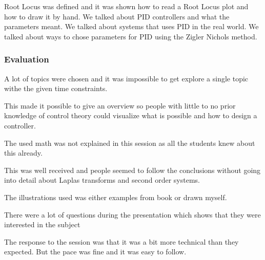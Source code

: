 Root Locus was defined and it was shown how to read a Root Locus plot and how to draw it by hand. 
We talked about PID controllers and what the parameters meant. 
We talked about systems that uses PID in the real world.
We talked about ways to chose parameters for PID using the Zigler Nichols method.

\subsubsection{Evaluation}
A lot of topics were chosen and it was impossible to get explore a single topic withe the given time constraints.

This made it possible to give an overview so people with little to no prior knowledge of control theory could visualize what is possible and how to design a controller.

The used math was not explained in this session as all the students knew about this already.

This was well received and people seemed to follow the conclusions without going into detail about Laplas transforms and second order systems.

The illustrations used was either examples from book
\cite[page. 12]{Control_Theory} 
or drawn myself.

There were a lot of questions during the presentation which shows that they were interested in the subject

The response to the session was that it was a bit more technical than they expected. 
But the pace was fine and it was easy to follow. 

